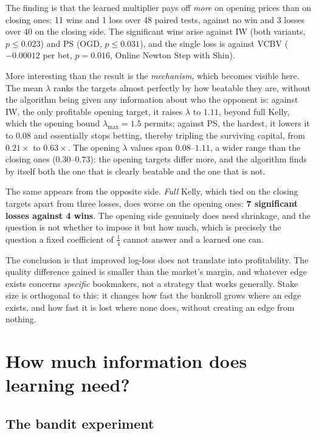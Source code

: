 \documentclass[12pt,a4paper,oneside]{report}
\renewcommand{\_}{\oldunderscore\allowbreak}
\theoremstyle{definition}
\theoremstyle{plain}
\theoremstyle{definition}   %
\begin{document}
The finding is that the learned multiplier pays off \emph{more} on opening prices than on closing
ones: 11 wins and 1 loss over 48 paired tests, against no win and 3 losses over 40 on the closing
side. The significant wins arise against IW (both variants, $p\leq0.023$) and PS (OGD,
$p\leq0.031$), and the single loss is against VC\_BV ($-0.00012$ per bet, $p=0.016$, Online
Newton Step with Shin).

More interesting than the result is the \emph{mechanism}, which becomes visible here. The mean
$\lambda$ ranks the targets almost perfectly by how beatable they are, without the algorithm being
given any information about who the opponent is: against IW, the only profitable opening target,
it raises $\lambda$ to $1.11$, beyond full Kelly, which the opening bound $\lambda_{\max}=1.5$
permits; against PS, the hardest, it lowers it to $0.08$ and essentially stops betting, thereby
tripling the surviving capital, from $0.21\times$ to $0.63\times$. The opening $\lambda$ values
span $0.08$--$1.11$, a wider range than the closing ones ($0.30$--$0.73$): the opening targets
differ more, and the algorithm finds by itself both the one that is clearly beatable and the one
that is not.

The same appears from the opposite side. \emph{Full} Kelly, which tied on the closing targets
apart from three losses, does worse on the opening ones: \textbf{7 significant losses against 4
wins}.
The opening side genuinely does need shrinkage, and the question is not whether to impose it but
how much, which is precisely the question a fixed coefficient of $\tfrac14$ cannot answer and a
learned one can.

The conclusion is that improved log-loss does not translate into profitability. The quality
difference gained is smaller than the market's margin, and whatever edge exists concerns
\emph{specific} bookmakers, not a strategy that works generally. Stake size is orthogonal to
this: it changes how fast the bankroll grows where an edge exists, and how fast it is lost where
none does, without creating an edge from nothing.

\section{How much information does learning need?}

\subsection{The bandit experiment}
\label{sec:res-bandit}
\end{document}
